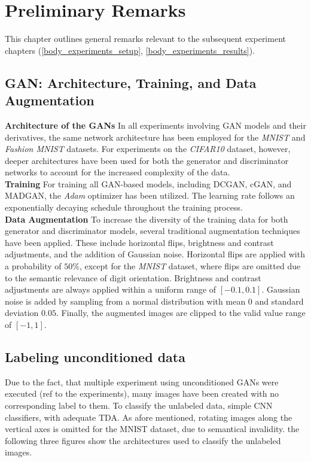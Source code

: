 \section{Preliminary Remarks}\label{body_prelim}
This chapter outlines general remarks relevant to the subsequent experiment chapters (\ref{body_experiments_setup}, \ref{body_experiments_results}).

\subsection{GAN: Architecture, Training, and Data Augmentation}

\noindent\textbf{Architecture of the GANs}
In all experiments involving GAN models and their derivatives, the same network architecture has been employed for the \textit{MNIST} and \textit{Fashion MNIST} datasets. For experiments on the \textit{CIFAR10} dataset, however, deeper architectures have been used for both the generator and discriminator networks to account for the increased complexity of the data.\\

\noindent\textbf{Training}
For training all GAN-based models, including DCGAN, cGAN, and MADGAN, the \textit{Adam} optimizer has been utilized. The learning rate follows an exponentially decaying schedule throughout the training process.\\

\noindent\textbf{Data Augmentation}
To increase the diversity of the training data for both generator and discriminator models, several traditional augmentation techniques have been applied. These include horizontal flips, brightness and contrast adjustments, and the addition of Gaussian noise.
Horizontal flips are applied with a probability of \(50\%\), except for the \textit{MNIST} dataset, where flips are omitted due to the semantic relevance of digit orientation. Brightness and contrast adjustments are always applied within a uniform range of \([-0.1, 0.1]\). Gaussian noise is added by sampling from a normal distribution with mean \(0\) and standard deviation \(0.05\). Finally, the augmented images are clipped to the valid value range of \([-1, 1]\).


\subsection{Labeling unconditioned data}
Due to the fact, that multiple experiment using unconditioned GANs were executed (ref to the experiments), many images have been created with no corresponding label to them. To classify the unlabeled data, simple CNN classifiers, with adequate TDA. As afore mentioned, rotating images along the vertical axes is omitted for the MNIST dataset, due to semantical invalidity. the following three figures show the architectures used to classify the unlabeled images.

